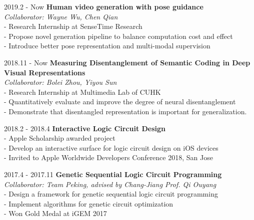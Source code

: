 \documentclass{academiccv}
\begin{document}
\begin{tablist}

\item[2019.2 - Now] 	\tab \textbf {Human video generation with pose guidance} \textbf
					\\ \tab \emph{Collaborator: Wayne Wu, Chen Qian}\emph
				    \\ \tab - Research Internship at SenseTime Research
				     \\ \tab - Propose novel generation pipeline to balance computation cost and effect
				     \\ \tab - Introduce better pose representation and multi-modal supervision	

\item[2018.11 - Now] 	\tab \textbf {Measuring Disentanglement of Semantic Coding in Deep Visual Representations} \textbf
					\\ \tab \emph{Collaborator: Bolei Zhou, Yiyou Sun}\emph
					\\ \tab - Research Internship at Multimedia Lab of CUHK
				      \\ \tab - Quantitatively evaluate and improve the degree of neural disentanglement
				      \\ \tab - Demonstrate that disentangled representation is important for generalization.
				   			     
				     
\item[2018.2 - 2018.4] 	\tab \textbf {Interactive Logic Circuit Design} \textbf
					\\ \tab - Apple Scholarship awarded project
				    \\ \tab - Develop an interactive surface for logic circuit design on iOS devices
				    \\ \tab - Invited to Apple Worldwide Developers Conference 2018, San Jose

\item[2017.4 - 2017.11] 	\tab \textbf {Genetic Sequential Logic Circuit Programming} \textbf
					\\ \tab \emph{Collaborator: Team Peking, advised by Chang-Jiang Prof. Qi Ouyang}\emph
					\\ \tab - Design a framework for genetic sequential logic circuit programming
				    \\ \tab - Implement algorithms for genetic circuit optimization
				    \\ \tab - Won Gold Medal at iGEM 2017		    
				     				     			     				      
\end{tablist}
\end{document}
